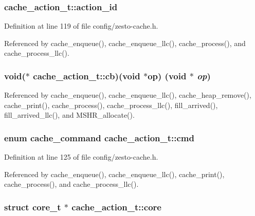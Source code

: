 \subsubsection[{action\_\-id}]{ {\bf cache\_\-action\_\-t::action\_\-id}}\label{structcache__action__t_b98c2aef0e59e6b9e656e0d74e6b823a}




Definition at line 119 of file config/zesto-cache.h.

Referenced by cache\_\-enqueue(), cache\_\-enqueue\_\-llc(), cache\_\-process(), and cache\_\-process\_\-llc().
\subsubsection[{cb}]{\setlength{\rightskip}{0pt plus 5cm}void($\ast$ {\bf cache\_\-action\_\-t::cb})(void $\ast${\bf op}) (void $\ast$ {\em op})}\label{structcache__action__t_467458e6ca1111dc1daa3db24fc9a82d}




Referenced by cache\_\-enqueue(), cache\_\-enqueue\_\-llc(), cache\_\-heap\_\-remove(), cache\_\-print(), cache\_\-process(), cache\_\-process\_\-llc(), fill\_\-arrived(), fill\_\-arrived\_\-llc(), and MSHR\_\-allocate().
\subsubsection[{cmd}]{\setlength{\rightskip}{0pt plus 5cm}enum {\bf cache\_\-command} {\bf cache\_\-action\_\-t::cmd}}\label{structcache__action__t_00684f61b3ca4efc139c942785d1d033}




Definition at line 125 of file config/zesto-cache.h.

Referenced by cache\_\-enqueue(), cache\_\-enqueue\_\-llc(), cache\_\-print(), cache\_\-process(), and cache\_\-process\_\-llc().
\subsubsection[{core}]{\setlength{\rightskip}{0pt plus 5cm}struct {\bf core\_\-t} $\ast$ {\bf cache\_\-action\_\-t::core}\hspace{0.3cm}{\tt  [read]}}\label{structcache__action__t_e6fe9f73b27ad880432f43db62acdb43}




